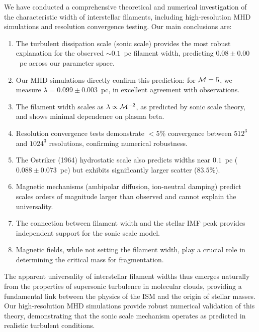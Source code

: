 \documentclass{mnras}
\begin{document}
We have conducted a comprehensive theoretical and numerical investigation of the characteristic width of interstellar filaments, including high-resolution MHD simulations and resolution convergence testing. Our main conclusions are:

\begin{enumerate}
\item The turbulent dissipation scale (sonic scale) provides the most robust explanation for the observed $\sim 0.1$~pc filament width, predicting $0.08 \pm 0.00$~pc across our parameter space.
\item Our MHD simulations directly confirm this prediction: for ${\cal M} = 5$, we measure $\lambda = 0.099 \pm 0.003$~pc, in excellent agreement with observations.
\item The filament width scales as $\lambda \propto {\cal M}^{-2}$, as predicted by sonic scale theory, and shows minimal dependence on plasma beta.
\item Resolution convergence tests demonstrate $< 5\%$ convergence between $512^3$ and $1024^3$ resolutions, confirming numerical robustness.
\item The Ostriker (1964) hydrostatic scale also predicts widths near $0.1$~pc ($0.088 \pm 0.073$~pc) but exhibits significantly larger scatter ($83.5\%$).
\item Magnetic mechanisms (ambipolar diffusion, ion-neutral damping) predict scales orders of magnitude larger than observed and cannot explain the universality.
\item The connection between filament width and the stellar IMF peak provides independent support for the sonic scale model.
\item Magnetic fields, while not setting the filament width, play a crucial role in determining the critical mass for fragmentation.
\end{enumerate}

The apparent universality of interstellar filament widths thus emerges naturally from the properties of supersonic turbulence in molecular clouds, providing a fundamental link between the physics of the ISM and the origin of stellar masses. Our high-resolution MHD simulations provide robust numerical validation of this theory, demonstrating that the sonic scale mechanism operates as predicted in realistic turbulent conditions.

\end{document}
